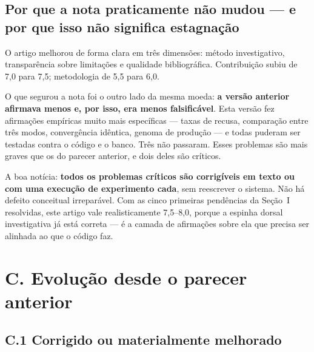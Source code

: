 \documentclass[11pt,a4paper]{article}
\begin{document}
\subsection*{Por que a nota praticamente não mudou --- e por que isso não significa estagnação}

O artigo melhorou de forma clara em três dimensões: método investigativo, transparência sobre
limitações e qualidade bibliográfica. Contribuição subiu de 7,0 para 7,5; metodologia de 5,5 para
6,0.

O que segurou a nota foi o outro lado da mesma moeda: \textbf{a versão anterior afirmava menos e,
por isso, era menos falsificável}. Esta versão fez afirmações empíricas muito mais específicas ---
taxas de recusa, comparação entre três modos, convergência idêntica, genoma de produção --- e todas
puderam ser testadas contra o código e o banco. Três não passaram. Esses problemas são mais graves
que os do parecer anterior, e dois deles são críticos.

A boa notícia: \textbf{todos os problemas críticos são corrigíveis em texto ou com uma execução de
experimento cada}, sem reescrever o sistema. Não há defeito conceitual irreparável. Com as cinco
primeiras pendências da Seção~I resolvidas, este artigo vale realisticamente 7,5--8,0, porque a
espinha dorsal investigativa já está correta --- é a camada de afirmações sobre ela que precisa ser
alinhada ao que o código faz.

\section*{C. Evolução desde o parecer anterior}

\subsection*{C.1 Corrigido ou materialmente melhorado}
\end{document}
